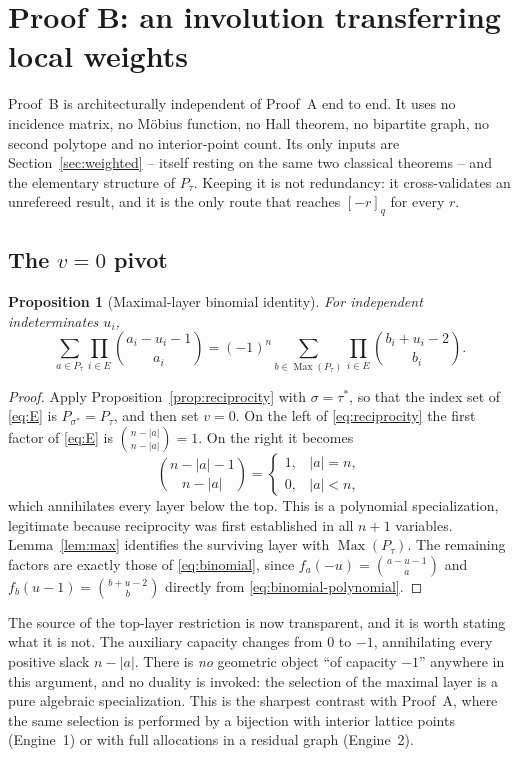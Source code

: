 \documentclass[11pt]{article}
\numberwithin{equation}{section}
\newtheorem{proposition}[theorem]{Proposition}
\theoremstyle{definition}
\theoremstyle{remark}
\newcommand{\Max}{\operatorname{Max}}
\newcommand{\qint}[1]{[#1]_q}
\begin{document}
\section{Proof B: an involution transferring local weights}
\label{sec:transfer}

Proof~B is architecturally independent of Proof~A end to end. It uses no
incidence matrix, no M\"obius function, no Hall theorem, no bipartite graph,
no second polytope and no interior-point count. Its only inputs are
Section~\ref{sec:weighted} -- itself resting on the same two classical
theorems -- and the elementary structure of $P_\tau$. Keeping it is not
redundancy: it cross-validates an unrefereed result, and it is the only route
that reaches $\qint{-r}$ for every $r$.

\subsection{The \texorpdfstring{$v=0$}{v=0} pivot}

\begin{proposition}[Maximal-layer binomial identity]
\label{prop:binomial}
For independent indeterminates $u_i$,
\begin{equation}
 \sum_{a\in P_\tau}\prod_{i\in E}\binom{a_i-u_i-1}{a_i}
 =(-1)^n\sum_{b\in \Max(P_\tau)}\prod_{i\in E}\binom{b_i+u_i-2}{b_i}.
 \label{eq:binomial}
\end{equation}
\end{proposition}

\begin{proof}
Apply Proposition~\ref{prop:reciprocity} with $\sigma=\tau^*$, so that the
index set of \eqref{eq:E} is $P_{\sigma^*}=P_\tau$, and then set $v=0$. On the
left of \eqref{eq:reciprocity} the first factor of \eqref{eq:E} is
$\binom{n-|a|}{n-|a|}=1$. On the right it becomes
\[
 \binom{n-|a|-1}{n-|a|}=
 \begin{cases}1,&|a|=n,\\0,&|a|<n,\end{cases}
\]
which annihilates every layer below the top. This is a polynomial
specialization, legitimate because reciprocity was first established in all
$n+1$ variables. Lemma~\ref{lem:max} identifies the surviving layer with
$\Max(P_\tau)$. The remaining factors are exactly those of
\eqref{eq:binomial}, since $f_a(-u)=\binom{a-u-1}{a}$ and
$f_b(u-1)=\binom{b+u-2}{b}$ directly from \eqref{eq:binomial-polynomial}.
\end{proof}

The source of the top-layer restriction is now transparent, and it is worth
stating what it is not. The auxiliary capacity changes from $0$ to $-1$,
annihilating every positive slack $n-|a|$. There is \emph{no} geometric object
``of capacity $-1$'' anywhere in this argument, and no duality is invoked: the
selection of the maximal layer is a pure algebraic specialization. This is the
sharpest contrast with Proof~A, where the same selection is performed by a
bijection with interior lattice points (Engine~1) or with full allocations in
a residual graph (Engine~2).
\end{document}
